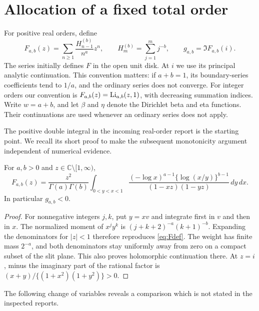 \section{Allocation of a fixed total order}
\label{sec:allocation}

For positive real orders, define
\begin{equation}\label{eq:Fdef}
 F_{a,b}(z)=\sum_{n\ge1}\frac{H_{n-1}^{(b)}}{n^a}z^n,
 \qquad H_m^{(b)}=\sum_{j=1}^m j^{-b},\qquad
 g_{a,b}=\Im F_{a,b}(i).
\end{equation}
The series initially defines $F$ in the open unit disk. At $i$ we use its
principal analytic continuation. This convention matters: if $a+b=1$,
its boundary-series coefficients tend to $1/a$, and the ordinary series
does not converge. For integer orders our convention is
$F_{a,b}(z)=\operatorname{Li}_{a,b}(z,1)$, with decreasing summation indices.
Write $w=a+b$, and let $\beta$ and $\eta$ denote the Dirichlet beta and
eta functions. Their continuations are used whenever an ordinary series
does not apply.

The positive double integral in the incoming real-order report
\cite{realorder} is the starting point. We recall its short proof to
make the subsequent monotonicity argument independent of numerical evidence.

\begin{lemma}\label{lem:double}
For $a,b>0$ and $z\in\mathbb C\setminus[1,\infty)$,
\begin{equation}\label{eq:double}
 F_{a,b}(z)=\frac{z^2}{\Gamma(a)\Gamma(b)}
 \int_{0<y<x<1}
 \frac{(-\log x)^{a-1}\{\log(x/y)\}^{b-1}}
 {(1-xz)(1-yz)}\,dy\,dx.
\end{equation}
In particular $g_{a,b}<0$.
\end{lemma}
\begin{proof}
For nonnegative integers $j,k$, put $y=xv$ and integrate first in $v$
and then in $x$. The normalized moment of $x^jy^k$ is
$(j+k+2)^{-a}(k+1)^{-b}$. Expanding the denominators for $|z|<1$
therefore reproduces \eqref{eq:Fdef}. The weight has finite mass $2^{-a}$,
and both denominators stay uniformly away from zero on a compact subset
of the slit plane. This also proves holomorphic continuation there.
At $z=i$, minus the imaginary part of the rational factor is
$(x+y)/\{(1+x^2)(1+y^2)\}>0$.
\end{proof}

The following change of variables reveals a comparison which is not
stated in the inspected reports.

